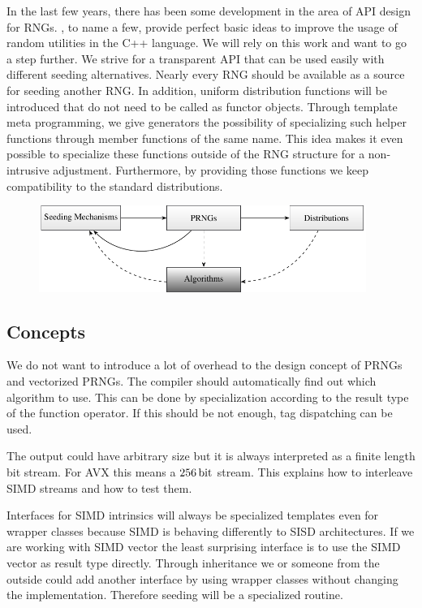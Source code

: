 \documentclass{stdlocal}
\begin{document}
  In the last few years, there has been some development in the area of API design for RNGs.
  \textcite{oneill-blog-api,oneill-blog-rd,cpp-std-seeding,cpp-std-random}, to name a few, provide perfect basic ideas to improve the usage of random utilities in the C++ language.
  We will rely on this work and want to go a step further.
  We strive for a transparent API that can be used easily with different seeding alternatives.
  Nearly every RNG should be available as a source for seeding another RNG.
  In addition, uniform distribution functions will be introduced that do not need to be called as functor objects.
  Through template meta programming, we give generators the possibility of specializing such helper functions through member functions of the same name.
  This idea makes it even possible to specialize these functions outside of the RNG structure for a non-intrusive adjustment.
  Furthermore, by providing those functions we keep compatibility to the standard distributions.

  \begin{figure}
    \center
    \includegraphics[width=0.95\textwidth]{figures/api_parts.pdf}
    \caption[Parts of the API Design]{}
    \label{fig:api-parts}
  \end{figure}

  \subsection{Concepts} %
  \label{sub:prng_concept}
    We do not want to introduce a lot of overhead to the design concept of PRNGs and vectorized PRNGs.
    The compiler should automatically find out which algorithm to use.
    This can be done by specialization according to the result type of the function operator.
    If this should be not enough, tag dispatching can be used.

    The output could have arbitrary size but it is always interpreted as a finite length bit stream.
    For AVX this means a $256\, \mathrm{bit}$ stream.
    This explains how to interleave SIMD streams and how to test them.

    Interfaces for SIMD intrinsics will always be specialized templates even for wrapper classes because SIMD is behaving differently to SISD architectures.
    If we are working with SIMD vector the least surprising interface is to use the SIMD vector as result type directly.
    Through inheritance we or someone from the outside could add another interface by using wrapper classes without changing the implementation.
    Therefore seeding will be a specialized routine.
\end{document}
